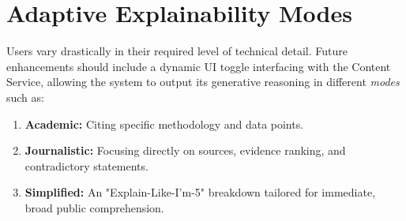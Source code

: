 \section{Adaptive Explainability Modes}
Users vary drastically in their required level of technical detail. Future enhancements should include a dynamic UI toggle interfacing with the Content Service, allowing the system to output its generative reasoning in different \textit{modes} such as:
\begin{enumerate}
    \item \textbf{Academic:} Citing specific methodology and data points.
    \item \textbf{Journalistic:} Focusing directly on sources, evidence ranking, and contradictory statements.
    \item \textbf{Simplified:} An "Explain-Like-I'm-5" breakdown tailored for immediate, broad public comprehension.
\end{enumerate}
